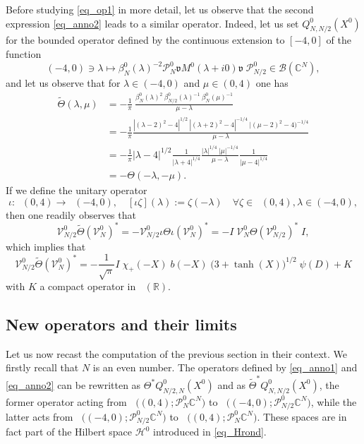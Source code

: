 \documentclass[11pt]{article}
\def\B{\mathscr B}
\def\C{\mathbb C}
\def\Hrond{\mathscr H}
\def\P{\mathcal P}
\def\R{\mathbb R}
\def\v{\mathfrak v}
\def\V{\mathcal V}
\def\ltwo{\mathop{\mathrm{L}^2}\nolimits}
\begin{document}
Before studying \eqref{eq_op1} in more detail, let us observe that the second expression
\eqref{eq_anno2} leads to a similar operator.
Indeed, let us set  $Q^0_{N,N/2}(X^0)$ for the bounded operator
defined by the continuous extension to $[-4,0]$ of the function
$$
(-4,0)\ni \lambda \mapsto  
\beta^0_{N}(\lambda)^{-2} \P_{N}^0\v M^0(\lambda+i0)\v\;\!\P_{N/2}^0 \in \B(\C^N),
$$
and let us observe that for $\lambda\in (-4,0)$ and $\mu\in (0,4)$ one has
\begin{align*}
\tilde \Theta(\lambda,\mu)
& =- \frac{1}{\pi}\  \frac{\beta^0_{N}(\lambda)^2 \ \beta^0_{N/2}(\lambda)^{-1} \ \beta^0_{N}(\mu)^{-1}}{\mu-\lambda} \\
& =  -\frac{1}{\pi}\frac{|(\lambda-2)^2-4|^{1/2}\ |(\lambda+2)^2-4|^{-1/4}\ 
|(\mu-2)^2-4)^{-1/4}}{\mu-\lambda} \\
& = -\frac{1}{\pi} |\lambda-4|^{1/2}\frac{1}{|\lambda+4|^{1/4}}
\frac{|\lambda|^{1/4}\ |\mu|^{-1/4}}{\mu-\lambda} \frac{1}{|\mu-4|^{1/4}} \\
& = -\Theta(-\lambda, -\mu).
\end{align*}
If we define the unitary operator 
\begin{equation}\label{eq_iota}
\iota: \ltwo(0,4)\to \ltwo(-4,0),  \quad 
[\iota \zeta](\lambda):=\zeta(-\lambda) \quad \forall \zeta \in \ltwo(0,4),
\lambda \in (-4,0),
\end{equation}
 then one
readily observes that
$$
\V_{N/2}^0\tilde \Theta (\V_N^0)^* 
= - \V_{N/2}^0\iota \Theta \iota(\V_N^0)^*  
= - I \;\!\V_{N}^0 \Theta (\V_{N/2}^0)^*\;\!I, 
$$
which implies that
\begin{equation}\label{eq_op2}
\V_{N/2}^0\tilde \Theta (\V_N^0)^* =
- \frac{1}{\sqrt{\pi}} I\;\!\chi_+(-X) \;\!b(-X)\;\! \big(3+\tanh(X)\big)^{1/2} \;\!\psi(D) + K
\end{equation}
with $K$ a compact operator in $\ltwo(\R)$.

\subsection{New operators and their limits}

Let us now recast the computation of the previous section in their context.
We firstly recall that $N$ is an even number. 
The operators defined by \eqref{eq_anno1} and \eqref{eq_anno2}
can be rewritten as $\Theta^* Q^0_{N/2,N}(X^0)$ and as
$\tilde \Theta^* Q^0_{N,N/2}(X^0)$, the former operator acting from
$\ltwo\big((0,4);\P^0_N \C^N\big)$ to
$\ltwo\big((-4,0);\P^0_{N/2} \C^N\big)$, while the latter acts from
$\ltwo\big((-4,0);\P^0_{N/2} \C^N\big)$ to 
$\ltwo\big((0,4);\P^0_N \C^N\big)$. These spaces are in fact part of the Hilbert
space $\Hrond^0$ introduced in \eqref{eq_Hrond}.
\end{document}
